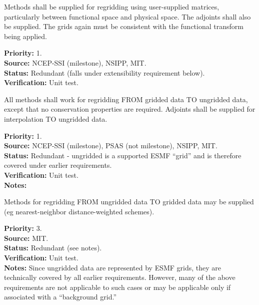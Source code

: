 
Methods shall be supplied for regridding using user-supplied matrices,
particularly between functional space and physical space.
The adjoints shall also be supplied.  The grids again must be consistent
with the functional transform being applied.

\begin{reqlist}
{\bf Priority:} 1. \\
{\bf Source:}  NCEP-SSI (milestone), NSIPP, MIT. \\
{\bf Status:} Redundant (falls under extensibility requirement below). \\
{\bf Verification:} Unit test. 
\end{reqlist}


All methods shall work for regridding FROM gridded data TO ungridded
data, except that no conservation properties are required.
Adjoints shall be supplied for interpolation TO ungridded data.

\begin{reqlist}
{\bf Priority:} 1. \\
{\bf Source:}  NCEP-SSI (milestone), PSAS (not milestone), NSIPP, MIT.  \\
{\bf Status:} Redundant - ungridded is a supported ESMF ``grid'' and is therefore
              covered under earlier requirements. \\
{\bf Verification:} Unit test. \\
{\bf Notes:} 
\end{reqlist}


Methods for regridding FROM ungridded data TO gridded data may be
supplied (eg nearest-neighbor distance-weighted schemes).

\begin{reqlist}
{\bf Priority:} 3. \\
{\bf Source:} MIT.  \\
{\bf Status:} Redundant (see notes). \\
{\bf Verification:} Unit test. \\
{\bf Notes:} Since ungridded data are represented by ESMF grids, they are
             technically covered by all earlier requirements.  However, many
             of the above requirements are not applicable to such cases or may
             be applicable only if associated with a ``background grid.''
\end{reqlist}

